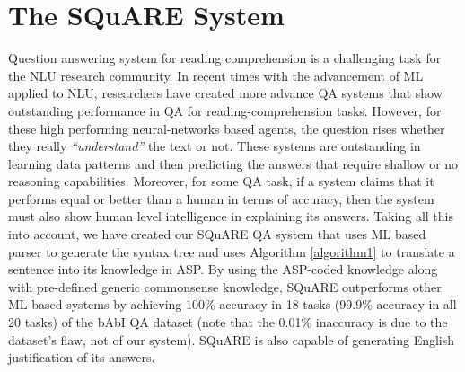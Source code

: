 \documentclass[letterpaper]{article}
\begin{document}


\section{The SQuARE System}
Question answering system for reading comprehension is a challenging task for the NLU research community. In recent times with the advancement of ML applied to NLU, researchers have created more advance QA systems that show outstanding performance in QA for reading-comprehension tasks. However, for these high performing neural-networks based agents, the question rises whether they really \textit{``understand''} the text or not. These systems are outstanding in learning data patterns and then predicting the answers that require shallow or no reasoning capabilities. Moreover, for some QA task, if a system claims that it performs equal or better than a human in terms of accuracy, then the system must also show human level intelligence in explaining its answers. Taking all this into account, we have created our SQuARE QA system that uses ML based parser to generate the syntax tree and uses Algorithm \ref{algorithm1} to translate a sentence into its knowledge in ASP. By using the ASP-coded knowledge along with pre-defined generic commonsense knowledge, SQuARE outperforms other ML based systems by achieving 100\% accuracy in 18 tasks (99.9\% accuracy in all 20 tasks) of the bAbI QA dataset (note that the 0.01\% inaccuracy is due to the dataset's flaw, not of our system). SQuARE is also capable of generating English justification of its answers.
\end{document}
